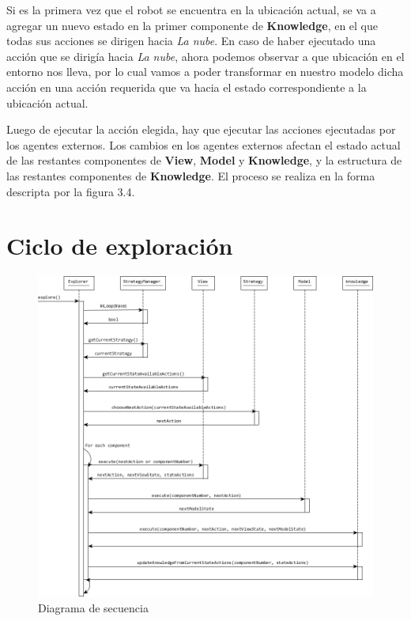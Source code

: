 \vspace{\baselineskip}
Si es la primera vez que el robot se encuentra en la ubicación actual, se va a agregar un nuevo estado en la primer componente de \textbf{Knowledge}, en el que todas
sus acciones se dirigen hacia \textit{La nube}. En caso de haber ejecutado una acción que se dirigía hacia \textit{La nube}, ahora podemos observar a que ubicación
en el entorno nos lleva, por lo cual vamos a poder transformar en nuestro modelo dicha acción en una acción requerida que va hacia el estado correspondiente
a la ubicación actual.

\vspace{\baselineskip}
Luego de ejecutar la acción elegida, hay que ejecutar las acciones ejecutadas por los agentes externos. Los cambios en los agentes externos afectan el estado actual
de las restantes componentes de \textbf{View}, \textbf{Model} y \textbf{Knowledge}, y la estructura de las restantes componentes de \textbf{Knowledge}. El proceso se
realiza en la forma descripta por la figura 3.4.

\section{Ciclo de exploración}

\begin{figure}[H]
  \centering
    \includegraphics[width=1.0\textwidth]{Imagenes/Algoritmo/Secuencia_explorar.png}
  \caption{Diagrama de secuencia}
  \label{fig:Secuencia_explorar}
\end{figure}

